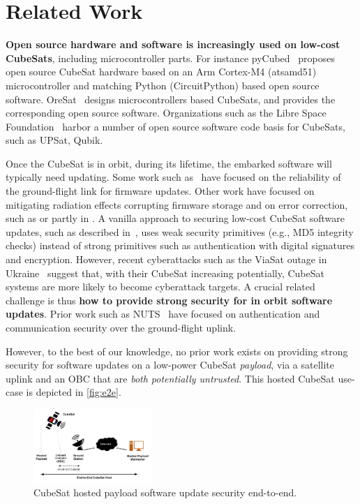 \section{Related Work}
\label{sec:background-related-work}

{\bf Open source hardware and software is increasingly used on low-cost CubeSats}, including microcontroller parts.
For instance pyCubed~\cite{Holliday2019PyCubed} proposes open source CubeSat hardware based on an Arm Cortex-M4 (atsamd51)
microcontroller and matching Python (CircuitPython) based open source software. OreSat~\cite{spivey2021oresat} designs
microcontrollers based CubeSats, and provides the corresponding open source software. Organizations such as the Libre
Space Foundation~\cite{librespace} harbor a number of open source software code basis for CubeSats, such as UPSat, Qubik.

Once the CubeSat is in orbit, during its lifetime, the embarked software will typically need updating.
Some work such as~\cite{FitzsimmonsReliableSoftwareUpdates} have focused on the reliability of the ground-flight link for firmware updates.
Other work have focused on mitigating radiation effects corrupting firmware storage and on error correction, such as \cite{yuen2019low}
or partly in \cite{sunter2016updatesnano}.
A vanilla approach to securing low-cost CubeSat software updates, such as described in~\cite{maison2021otaeducubesat},
uses weak security primitives (e.g., MD5 integrity checks) instead of strong primitives such as authentication
with digital signatures and encryption.
However, recent cyberattacks such as the ViaSat outage in Ukraine~\cite{viasat-cyberattack} suggest that, with their CubeSat
increasing potentially, CubeSat systems are more likely to become cyberattack targets.
A crucial related challenge is thus {\bf how to provide strong security for in orbit software updates}.
Prior work such as NUTS~\cite{birkeland2014nutsoverview,bezem2013nutsAuthenticatedUplink} have focused on authentication
and communication security over the ground-flight uplink.

However, to the best of our knowledge, no prior work exists on providing strong security for software updates on a low-power
CubeSat \textit{payload}, via a satellite uplink and an OBC that are \textit{both potentially untrusted}.
This hosted CubeSat use-case is depicted in \autoref{fig:e2e}.

\begin{figure}[t]
    \centering
    \includegraphics[width=0.4\textwidth]{Figures/CubeSat-Payload-End2End.png}
    \caption{CubeSat hosted payload software update security end-to-end.}
    \label{fig:e2e}
\end{figure}

